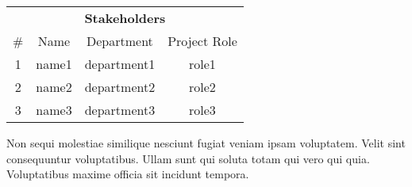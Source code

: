 
\begin{center}
\begin{table}[H]
\centering
\begin{tabular}{cccc}
\multicolumn{4}{c}{\textbf{Stakeholders}} \\
\#  &   Name    &   Department  &   Project Role    \\ \hline \midrule
1   &   name1   &   department1 &   role1           \\
2   &   name2   &   department2 &   role2           \\
3   &   name3   &   department3 &   role3           \\
\end{tabular}
\end{table}
\end{center}

Non sequi molestiae similique nesciunt fugiat veniam ipsam voluptatem. Velit sint consequuntur voluptatibus. Ullam sunt qui soluta totam qui vero qui quia. Voluptatibus maxime officia sit incidunt tempora.
